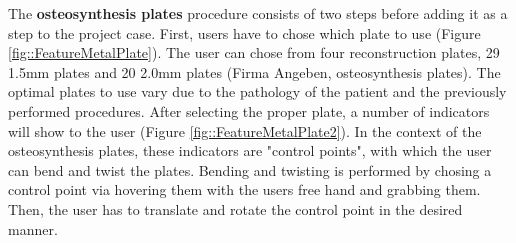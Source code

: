 The \textbf{osteosynthesis plates} procedure consists of two steps before adding it as a step to the project case.
First, users have to chose which plate to use (Figure \ref{fig::FeatureMetalPlate}).
The user can chose from four reconstruction plates, 29 1.5mm plates and 20 2.0mm plates (Firma Angeben, osteosynthesis plates).
The optimal plates to use vary due to the pathology of the patient and the previously performed procedures.
After selecting the proper plate, a number of indicators will show to the user (Figure \ref{fig::FeatureMetalPlate2}).
In the context of the osteosynthesis plates, these indicators are "control points", with which the user can bend and twist the plates.
Bending and twisting is performed by chosing a control point via hovering them with the users free hand and grabbing them.
Then, the user has to translate and rotate the control point in the desired manner.
